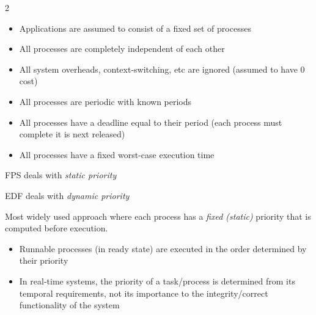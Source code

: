 \documentclass[a4paper,11pt]{article}
\begin{document}
\begin{multicols}{2}\begin{itemize}
\item \begin{minipage}[t]{\linewidth}Applications are assumed to consist of a fixed set of processes\end{minipage}
\item \begin{minipage}[t]{\linewidth}All processes are completely independent of each other\end{minipage}
\item \begin{minipage}[t]{\linewidth}All system overheads, context-switching, etc are ignored (assumed to have 0 cost)\end{minipage}
\item \begin{minipage}[t]{\linewidth}All processes are periodic with known periods\end{minipage}
\item \begin{minipage}[t]{\linewidth}All processes have a deadline equal to their period (each process must complete it is next released)\end{minipage}
\item \begin{minipage}[t]{\linewidth}All processes have a fixed worst-case execution time\end{minipage}
\end{itemize}\end{multicols}

\Needspace{75pt}

FPS deals with \emph{static priority}\par

EDF deals with \emph{dynamic priority}\par

\Needspace{75pt}

Most widely used approach where each process has a \emph{fixed (static)} priority that is computed before execution.\par

\begin{itemize}
\item Runnable processes (in ready state) are executed in the order determined by their priority
\item In real-time systems, the priority of a task/process is determined from its temporal requirements, not its importance to the integrity/correct functionality of the system
\end{itemize}
\end{document}
